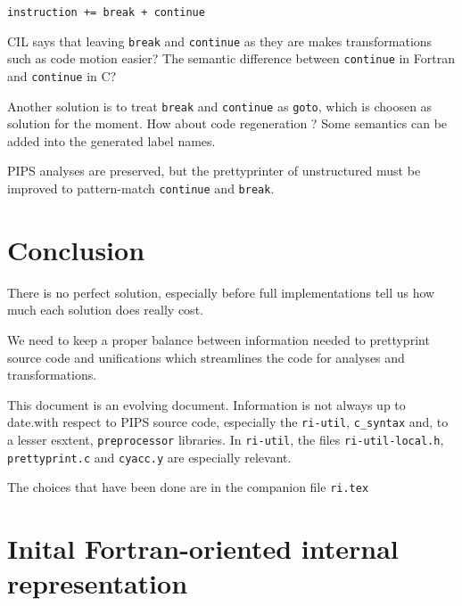 \documentclass[a4paper]{report}
\begin{document}
\verb/instruction += break + continue /

CIL says that leaving \verb/break/ and \verb/continue/ as they are
makes transformations such as code motion easier? The semantic
difference between \verb/continue/ in Fortran and \verb/continue/ in
C?

Another solution is to treat \verb/break/ and \verb/continue/ as
\verb/goto/, which is choosen as solution for the moment. How about code
regeneration ? Some semantics can be added into the generated label names.

PIPS analyses are preserved, but the prettyprinter of unstructured
must be improved to pattern-match \verb/continue/ and \verb/break/.

\chapter*{Conclusion}

There is no perfect solution, especially before full implementations
tell us how much each solution does really cost.

We need to keep a proper balance between information needed to
prettyprint source code and unifications which streamlines the code
for analyses and transformations.

This document is an evolving document. Information is not always up to
date.with respect to PIPS source code, especially the \verb/ri-util/,
\verb/c_syntax/ and, to a lesser esxtent, \verb/preprocessor/
libraries. In \verb/ri-util/, the files \verb/ri-util-local.h/,
\verb/prettyprint.c/ and \verb/cyacc.y/ are especially relevant.

\nocite{Kern78, Necu02}

The choices that have been done are in the companion file \texttt{ri.tex}


\appendix{}

\chapter{Inital Fortran-oriented internal representation}
\end{document}
